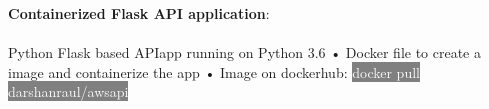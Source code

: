 \documentclass[9pt]{developercv} %
\begin{document}
\begin{minipage}[t]{1\textwidth}
 \textbf{Containerized Flask API application}:\\\\Python Flask based APIapp running on Python 3.6 • Docker file to create a image and containerize the app • Image on dockerhub: \colorbox{gray}{\textcolor{white}{docker pull darshanraul/awsapi}}\\\\\\\\
\end{minipage}
\end{document}

